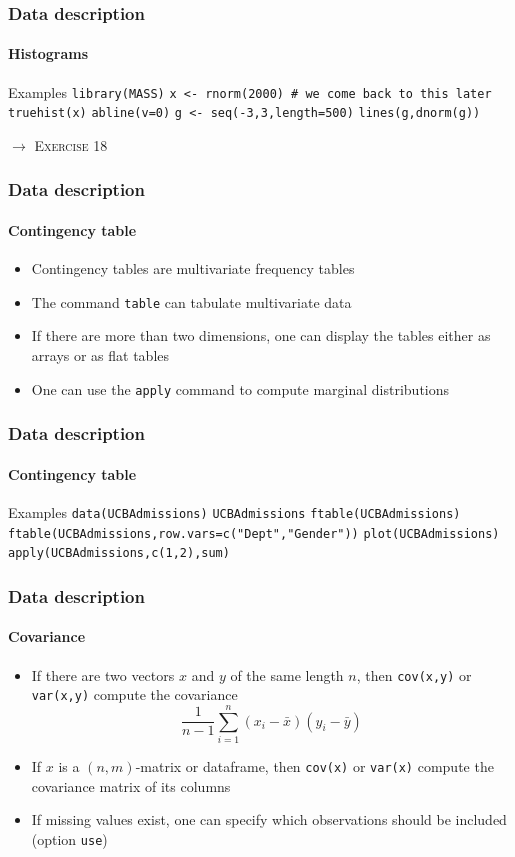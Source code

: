 \documentclass[title={Introduction to R}, author={Mutschler and Zaharieva}, inst={Institute for Econometrics and Empirical Economics}]{beamer}
\begin{document}
\begin{frame}
\frametitle{Data description}
\framesubtitle{Histograms}
\begin{block}{Examples}
\texttt{library(MASS)}\newline
\texttt{x <- rnorm(2000) \# we come back to this later}\newline
\texttt{truehist(x)}\newline
\texttt{abline(v=0)}\newline
\texttt{g <- seq(-3,3,length=500)}\newline
\texttt{lines(g,dnorm(g))}
\end{block}\pause
$\longrightarrow $ \textsc{Exercise 18}
\end{frame}


\begin{frame}
\frametitle{Data description}
\framesubtitle{Contingency table}
\begin{itemize}
\item Contingency tables are multivariate frequency tables
\item The command \texttt{table} can tabulate multivariate data
\item If there are more than two dimensions, one can display
the tables either as arrays or as flat tables
\item One can use the \texttt{apply} command to compute marginal
distributions
\end{itemize}
\end{frame}


\begin{frame}
\frametitle{Data description}
\framesubtitle{Contingency table}
\begin{block}{Examples}
\texttt{data(UCBAdmissions)}\newline
\texttt{UCBAdmissions}\newline
\texttt{ftable(UCBAdmissions)}\newline
\texttt{ftable(UCBAdmissions,row.vars=c("Dept","Gender"))}\newline
\texttt{plot(UCBAdmissions)}\newline
\texttt{apply(UCBAdmissions,c(1,2),sum)}
\end{block}
\end{frame}


\begin{frame}
\frametitle{Data description}
\framesubtitle{Covariance}
\begin{itemize}
\item If there are two vectors $x$ and $y$ of the same length $n$, then 
\texttt{cov(x,y)} or \texttt{var(x,y)} compute the covariance%
\begin{equation*}
\frac{1}{n-1}\sum_{i=1}^{n}\left( x_{i}-\bar{x}\right) \left( y_{i}-\bar{y}%
\right)
\end{equation*}
\item If $x$ is a $\left( n,m\right) $-matrix or dataframe, then \texttt{cov(x)} or \texttt{var(x)} compute the covariance matrix of its columns
\item If missing values exist, one can specify which observations should be
included (option \texttt{use})
\end{itemize}
\end{frame}
\end{document}
